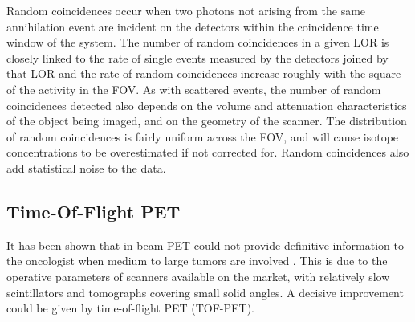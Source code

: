 Random coincidences occur when two photons not arising from the same annihilation event are incident on the detectors within the coincidence time window of the system. The number of random coincidences in a given LOR is closely linked to the rate of single events measured by the detectors joined by that LOR and the rate of random coincidences increase roughly with the square of the activity in the FOV. As with scattered events, the number of random coincidences detected also depends on the volume and attenuation characteristics of the object being imaged, and on the geometry of the scanner. The distribution of random coincidences is fairly uniform across the FOV, and will cause isotope concentrations to be overestimated if not corrected for. Random coincidences also add statistical noise to the data.
\newpage
\subsection{Time-Of-Flight PET}

It has been shown that in-beam PET could not provide definitive information to the oncologist when medium to large tumors are involved \cite{Fiedler2006}. This is due to the operative parameters of scanners available on the market, with relatively slow scintillators and tomographs covering small solid angles. A decisive improvement could be given by time-of-flight PET (TOF-PET).

